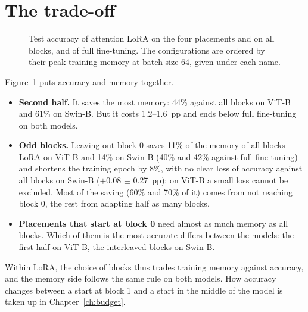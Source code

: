 \section{The trade-off}

\begin{figure}[!htb]
\centering
{\renewcommand{\figH}{0.27\textwidth}}
\caption{Test accuracy of attention LoRA on the four placements and on all blocks, and of full fine-tuning. The
configurations are ordered by their peak training memory at batch size 64, given under each name.}
\label{fig:placement}
\end{figure}

Figure~\ref{fig:placement} puts accuracy and memory together.
\begin{itemize}
  \item \textbf{Second half.} It saves the most memory: 44\% against all blocks on ViT-B and 61\% on Swin-B. But it
        costs 1.2--1.6~pp and ends below full fine-tuning on both models.
  \item \textbf{Odd blocks.} Leaving out block 0 saves 11\% of the memory of all-blocks LoRA on ViT-B and 14\% on
        Swin-B (40\% and 42\% against full fine-tuning) and shortens the training epoch by 8\%, with no clear
        loss of accuracy against all blocks on Swin-B ($+$0.08 $\pm$ 0.27~pp); on ViT-B a small loss cannot be excluded. Most of the saving
        (60\% and 70\% of it) comes from not reaching block 0, the rest from adapting half as many blocks.
  \item \textbf{Placements that start at block 0} need almost as much memory as all blocks. Which of them is the
        most accurate differs between the models: the first half on ViT-B, the interleaved blocks on Swin-B.
\end{itemize}
Within LoRA, the choice of blocks thus trades training memory against accuracy, and the memory side follows the
same rule on both models. How accuracy changes between a start at block 1 and a start in the middle of the model is
taken up in Chapter~\ref{ch:budget}.
